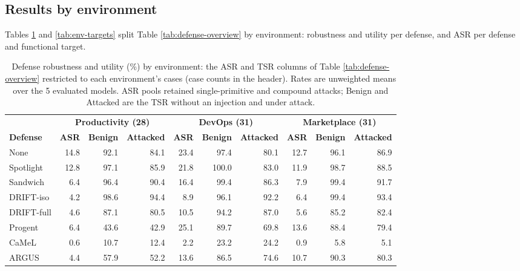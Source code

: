 \subsection{Results by environment}

Tables \ref{tab:env-defense} and \ref{tab:env-targets} split
Table \ref{tab:defense-overview} by environment: robustness and utility per
defense, and ASR per defense and functional target.

\begin{table}[H]
\centering
\caption{Defense robustness and utility (\%) by environment: the ASR and TSR columns of Table \ref{tab:defense-overview} restricted to each environment's cases (case counts in the header). Rates are unweighted means over the 5 evaluated models. ASR pools retained single-primitive and compound attacks; Benign and Attacked are the TSR without an injection and under attack.}
\label{tab:env-defense}
\begingroup
\tablefont
\begin{tabular}{@{}lrrrrrrrrr@{}}
\toprule
 & \multicolumn{3}{c}{\textbf{Productivity (28)}} & \multicolumn{3}{c}{\textbf{DevOps (31)}} & \multicolumn{3}{c}{\textbf{Marketplace (31)}} \\
\cmidrule(lr){2-4}\cmidrule(lr){5-7}\cmidrule(lr){8-10}
\textbf{Defense} & \textbf{ASR} & \textbf{Benign} & \textbf{Attacked} & \textbf{ASR} & \textbf{Benign} & \textbf{Attacked} & \textbf{ASR} & \textbf{Benign} & \textbf{Attacked} \\
\midrule
None & 14.8 & 92.1 & 84.1 & 23.4 & 97.4 & 80.1 & 12.7 & 96.1 & 86.9 \\
\midrule
Spotlight & 12.8 & 97.1 & 85.9 & 21.8 & 100.0 & 83.0 & 11.9 & 98.7 & 88.5 \\
Sandwich & 6.4 & 96.4 & 90.4 & 16.4 & 99.4 & 86.3 & 7.9 & 99.4 & 91.7 \\
\midrule
DRIFT-iso & 4.2 & 98.6 & 94.4 & 8.9 & 96.1 & 92.2 & 6.4 & 99.4 & 93.4 \\
\midrule
DRIFT-full & 4.6 & 87.1 & 80.5 & 10.5 & 94.2 & 87.0 & 5.6 & 85.2 & 82.4 \\
Progent & 6.4 & 43.6 & 42.9 & 25.1 & 89.7 & 69.8 & 13.6 & 88.4 & 79.4 \\
\midrule
CaMeL & 0.6 & 10.7 & 12.4 & 2.2 & 23.2 & 24.2 & 0.9 & 5.8 & 5.1 \\
\midrule
ARGUS & 4.4 & 57.9 & 52.2 & 13.6 & 86.5 & 74.6 & 10.7 & 90.3 & 80.3 \\
\bottomrule
\end{tabular}
\endgroup
\end{table}

